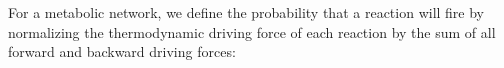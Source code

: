 For a metabolic network, we define the probability that a reaction will fire by normalizing the thermodynamic driving force of each reaction by the sum of all forward and backward driving forces: